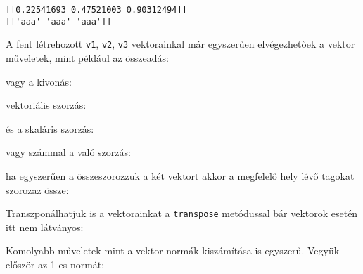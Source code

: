 \begin{verbatim}
[[0.22541693 0.47521003 0.90312494]]
[['aaa' 'aaa' 'aaa']]
\end{verbatim}

    A fent létrehozott \texttt{v1}, \texttt{v2}, \texttt{v3} vektorainkal
már egyszerűen elvégezhetőek a vektor műveletek, mint például az
összeadás:

\begin{python}

\end{python}

    vagy a kivonás:

\begin{python}

\end{python}

    vektoriális szorzás:

\begin{python}

\end{python}

    és a skaláris szorzás:

\begin{python}

\end{python}

    vagy számmal a való szorzás:

\begin{python}

\end{python}

    ha egyszerűen a összeszorozzuk a két vektort akkor a megfelelő hely lévő
tagokat szorozaz össze:

\begin{python}

\end{python}

    Transzponálhatjuk is a vektorainkat a \texttt{transpose} metódussal bár
vektorok esetén itt nem látványos:

\begin{python}

\end{python}

    Komolyabb műveletek mint a vektor normák kiszámítása is egyszerű. Vegyük
először az 1-es normát:

\begin{python}

\end{python}

